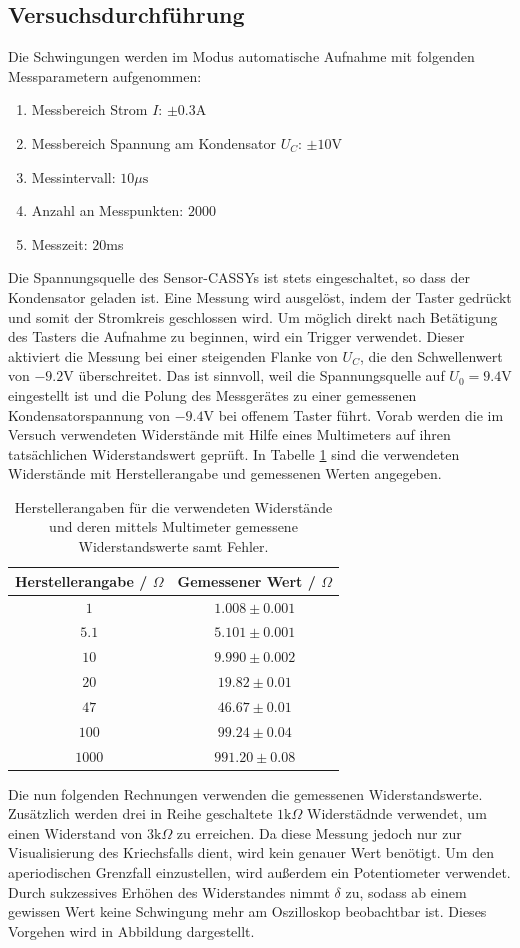 \documentclass[a4paper, 12pt]{scrartcl}
\begin{document}
\subsection{Versuchsdurchführung}

Die Schwingungen werden im Modus \glqq automatische Aufnahme\grqq{} mit folgenden Messparametern aufgenommen:
\begin{enumerate}[-]
\item Messbereich Strom $I$: $\pm 0.3$A
\item Messbereich Spannung am Kondensator $U_C$: $\pm 10$V
\item Messintervall: $10\mu\text{s}$
\item Anzahl an Messpunkten: $2000$
\item Messzeit: $20$ms
\end{enumerate}
Die Spannungsquelle des Sensor-CASSYs ist stets eingeschaltet, so dass der Kondensator geladen ist. Eine Messung wird ausgelöst, indem der Taster gedrückt und somit der Stromkreis geschlossen wird. Um möglich direkt nach Betätigung des Tasters die Aufnahme zu beginnen, wird ein Trigger verwendet. Dieser aktiviert die Messung bei einer steigenden Flanke von $U_C$, die den Schwellenwert von $-9.2$V überschreitet. Das ist sinnvoll, weil die Spannungsquelle auf $U_0 = 9.4$V eingestellt ist und die Polung des Messgerätes zu einer gemessenen Kondensatorspannung von $-9.4$V bei offenem Taster führt. 
Vorab werden die im Versuch verwendeten Widerstände mit Hilfe eines Multimeters auf ihren tatsächlichen Widerstandswert geprüft. In Tabelle \ref{tab:widerstaende} sind die verwendeten Widerstände mit Herstellerangabe und gemessenen Werten angegeben.

\begin{table}[H]
\centering
\begin{tabular}{c|c}
Herstellerangabe / $\Omega$ & Gemessener Wert / $\Omega$ \\
\hline
$1$ & $1.008 \pm 0.001$ \\
$5.1$ & $5.101 \pm 0.001$ \\
$10$ & $9.990 \pm 0.002$ \\
$20$ & $19.82 \pm 0.01$ \\
$47$ & $46.67 \pm 0.01$ \\
$100$ & $99.24 \pm 0.04$ \\
$1000$ & $991.20\pm 0.08$
\end{tabular}
\caption{Herstellerangaben für die verwendeten Widerstände und deren mittels Multimeter gemessene Widerstandswerte samt Fehler.}
\label{tab:widerstaende}
\end{table}
Die nun folgenden Rechnungen verwenden die gemessenen Widerstandswerte. Zusätzlich werden drei in Reihe geschaltete $1\text{k}\Omega$ Widerstädnde verwendet, um einen Widerstand von $3\text{k}\Omega$ zu erreichen. Da diese Messung jedoch nur zur Visualisierung des Kriechsfalls dient, wird kein genauer Wert benötigt. Um den aperiodischen Grenzfall einzustellen, wird außerdem ein Potentiometer verwendet. Durch sukzessives Erhöhen des Widerstandes nimmt $\delta$ zu, sodass ab einem gewissen Wert keine Schwingung mehr am Oszilloskop beobachtbar ist. Dieses Vorgehen wird in Abbildung dargestellt.
\end{document}
